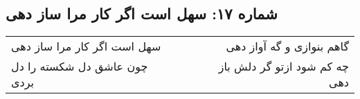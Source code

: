 \begin{center}
\section*{شماره ۱۷: سهل است اگر کار مرا ساز دهی}
\label{sec:017}
\begin{longtable}{l p{0.5cm} r}
سهل است اگر کار مرا ساز دهی
&&
گاهم بنوازی و گه آواز دهی
\\
چون عاشق دل شکسته را دل بردی
&&
چه کم شود ازتو گر دلش باز دهی
\\
\end{longtable}
\end{center}

